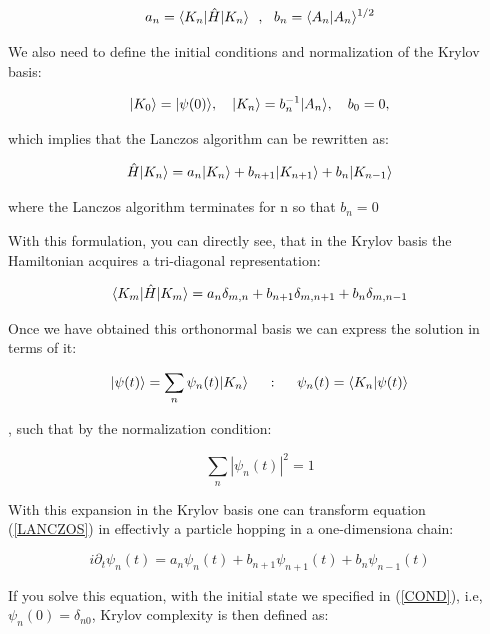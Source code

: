 \documentclass[11pt,a4paper]{article}
\begin{document}
\begin{equation}
    a_n = \langle K_n\rvert\hat{H}\lvert K_n\rangle ~~,~~ b_n = \langle A_n | A_n \rangle^{1/2}
\end{equation}

We also need to define the initial conditions and normalization of the Krylov basis:

\begin{equation}\LA{COND}
    \ket{K_0} = \ket{\psi(0)}, ~~~ \ket{K_n} = b_n^{-1}\ket{A_n}, ~~~ b_0=0,
\end{equation}

{\noindent which implies that the Lanczos algorithm can be rewritten as:}

\begin{equation}\LA{LANCZOS}
    \hat{H}\ket{K_n} = a_n\ket{K_n}+b_{n+1}\ket{K_{n+1}}+b_n\ket{K_{n-1}}
\end{equation}

{\noindent where the Lanczos algorithm terminates for n so that $b_n=0$}

With this formulation, you can directly see, that in the Krylov basis the Hamiltonian acquires a tri-diagonal representation:

\begin{equation}
    \langle K_m\rvert\hat{H}\lvert K_m\rangle = a_n\delta_{m,n} + b_{n+1}\delta_{m,n+1} + b_n\delta_{m,n-1}
\end{equation}

Once we have obtained this orthonormal basis we can express the solution in terms of it:

\begin{equation}
    \lvert\psi(t)\rangle = \sum_n\psi_n(t)\lvert K_n\rangle ~~~~:~~~~ \psi_n(t) = \langle K_n|\psi(t)\rangle
\end{equation}

{\noindent, such that by the normalization condition:}

\begin{equation}
    \sum_n\left|\psi_n(t)\right|^2 = 1
\end{equation}

With this expansion in the Krylov basis one can transform equation (\ref{LANCZOS}) in effectivly a particle hopping in a one-dimensiona chain:

\begin{equation}
    i\partial_t\psi_n(t) = a_n\psi_n(t) + b_{n+1}\psi_{n+1}(t) + b_n\psi_{n-1}(t)
\end{equation}

If you solve this equation, with the initial state we specified in (\ref{COND}), i.e, $\psi_n(0) = \delta_{n0}$, Krylov complexity is then defined as:
\end{document}
